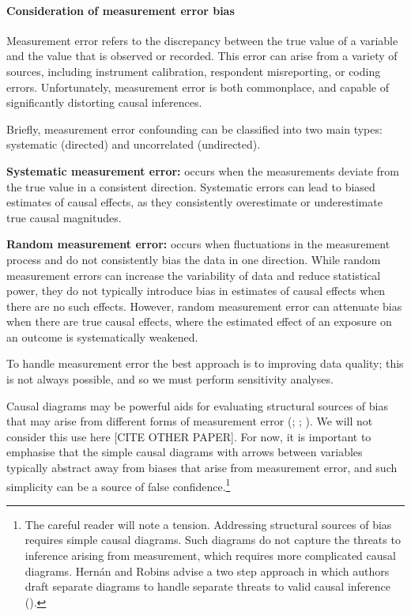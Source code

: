 \documentclass[
  singlecolumn,
  9pt]{article}
\let\oldparagraph\paragraph
\renewcommand{\paragraph}[1]{\oldparagraph{#1}\mbox{}}
\begin{document}
\paragraph{Consideration of measurement error
bias}\label{consideration-of-measurement-error-bias}

Measurement error refers to the discrepancy between the true value of a
variable and the value that is observed or recorded. This error can
arise from a variety of sources, including instrument calibration,
respondent misreporting, or coding errors. Unfortunately, measurement
error is both commonplace, and capable of significantly distorting
causal inferences.

Briefly, measurement error confounding can be classified into two main
types: systematic (directed) and uncorrelated (undirected).

\textbf{Systematic measurement error:} occurs when the measurements
deviate from the true value in a consistent direction. Systematic errors
can lead to biased estimates of causal effects, as they consistently
overestimate or underestimate true causal magnitudes.

\textbf{Random measurement error:} occurs when fluctuations in the
measurement process and do not consistently bias the data in one
direction. While random measurement errors can increase the variability
of data and reduce statistical power, they do not typically introduce
bias in estimates of causal effects when there are no such effects.
However, random measurement error can attenuate bias when there are true
causal effects, where the estimated effect of an exposure on an outcome
is systematically weakened.

To handle measurement error the best approach is to improving data
quality; this is not always possible, and so we must perform sensitivity
analyses.

Causal diagrams may be powerful aids for evaluating structural sources
of bias that may arise from different forms of measurement error
(;
;
). We will
not consider this use here {[}CITE OTHER PAPER{]}. For now, it is
important to emphasise that the simple causal diagrams with arrows
between variables typically abstract away from biases that arise from
measurement error, and such simplicity can be a source of false
confidence.\footnote{The careful reader will note a tension. Addressing
  structural sources of bias requires simple causal diagrams. Such
  diagrams do not capture the threats to inference arising from
  measurement, which requires more complicated causal diagrams. Hernán
  and Robins advise a two step approach in which authors draft separate
  diagrams to handle separate threats to valid causal inference
  ().}
\end{document}
